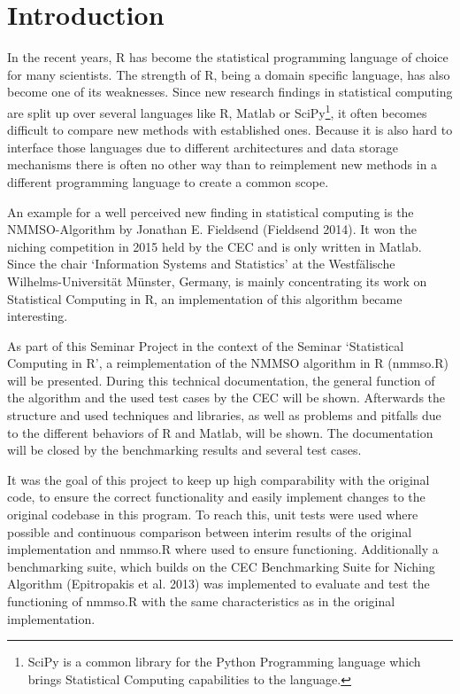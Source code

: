 \documentclass[12pt,a4paper]{article}
\begin{document}
\renewcommand\refname{References} %


\newpage
{} %
\tableofcontents
\newpage


\section{Introduction}\label{introduction}

In the recent years, R has become the statistical programming language
of choice for many scientists. The strength of R, being a domain
specific language, has also become one of its weaknesses. Since new
research findings in statistical computing are split up over several
languages like R, Matlab or SciPy\footnote{SciPy is a common library for
  the Python Programming language which brings Statistical Computing
  capabilities to the language. \newpage}, it often becomes difficult to
compare new methods with established ones. Because it is also hard to
interface those languages due to different architectures and data
storage mechanisms there is often no other way than to reimplement new
methods in a different programming language to create a common scope.

An example for a well perceived new finding in statistical computing is
the NMMSO-Algorithm by Jonathan E. Fieldsend (Fieldsend 2014). It won
the niching competition in 2015 held by the CEC and is only written in
Matlab. Since the chair `Information Systems and Statistics' at the
Westfälische Wilhelms-Universität Münster, Germany, is mainly
concentrating its work on Statistical Computing in R, an implementation
of this algorithm became interesting.

As part of this Seminar Project in the context of the Seminar
`Statistical Computing in R', a reimplementation of the NMMSO algorithm
in R (nmmso.R) will be presented. During this technical documentation,
the general function of the algorithm and the used test cases by the CEC
will be shown. Afterwards the structure and used techniques and
libraries, as well as problems and pitfalls due to the different
behaviors of R and Matlab, will be shown. The documentation will be
closed by the benchmarking results and several test cases.

It was the goal of this project to keep up high comparability with the
original code, to ensure the correct functionality and easily implement
changes to the original codebase in this program. To reach this, unit
tests were used where possible and continuous comparison between interim
results of the original implementation and nmmso.R where used to ensure
functioning. Additionally a benchmarking suite, which builds on the CEC
Benchmarking Suite for Niching Algorithm (Epitropakis et al. 2013) was
implemented to evaluate and test the functioning of nmmso.R with the
same characteristics as in the original implementation.
\end{document}
